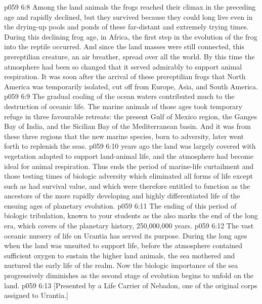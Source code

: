 \vs p059 6:8 \pc Among the land animals the frogs reached their climax in the preceding age and rapidly declined, but they survived because they could long live even in the drying\hyp{}up pools and ponds of these far\hyp{}distant and extremely trying times. During this declining frog age, in Africa, the first step in the evolution of the frog into the reptile occurred. And since the land masses were still connected, this prereptilian creature, an air breather, spread over all the world. By this time the atmosphere had been so changed that it served admirably to support animal respiration. It was soon after the arrival of these prereptilian frogs that North America was temporarily isolated, cut off from Europe, Asia, and South America.
\vs p059 6:9 The gradual cooling of the ocean waters contributed much to the destruction of oceanic life. The marine animals of those ages took temporary refuge in three favourable retreats: the present Gulf of Mexico region, the Ganges Bay of India, and the Sicilian Bay of the Mediterranean basin. And it was from these three regions that the new marine species, born to adversity, later went forth to replenish the seas.
\vs p059 6:10 \pc {} years ago the land was largely covered with vegetation adapted to support land\hyp{}animal life, and the atmosphere had become ideal for animal respiration. Thus ends the period of marine\hyp{}life curtailment and those testing times of biologic adversity which eliminated all forms of life except such as had survival value, and which were therefore entitled to function as the ancestors of the more rapidly developing and highly differentiated life of the ensuing ages of planetary evolution.
\vs p059 6:11 The ending of this period of biologic tribulation, known to your students as the  also marks the end of the long  era, which covers  of the planetary history, 250,000,000 years.
\vs p059 6:12 The vast oceanic nursery of life on Urantia has served its purpose. During the long ages when the land was unsuited to support life, before the atmosphere contained sufficient oxygen to sustain the higher land animals, the sea mothered and nurtured the early life of the realm. Now the biologic importance of the sea progressively diminishes as the second stage of evolution begins to unfold on the land.
\vsetoff
\vs p059 6:13 [Presented by a Life Carrier of Nebadon, one of the original corps assigned to Urantia.]
\quizlink
